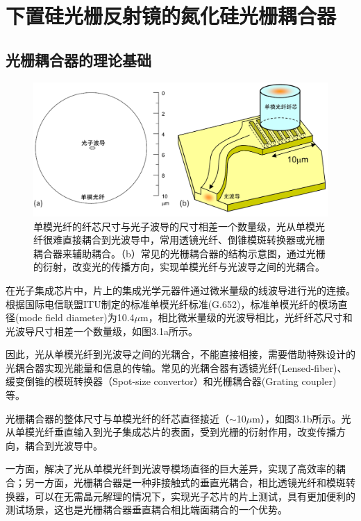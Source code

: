\chapter{下置硅光栅反射镜的氮化硅光栅耦合器}\label{chap:3}


\section{光栅耦合器的理论基础}


\begin{figure}[!htbp]
    \centering
    \includegraphics[width=1\textwidth]{Img/3-1.png}
    \caption{单模光纤的纤芯尺寸与光子波导的尺寸相差一个数量级，光从单模光纤很难直接耦合到光波导中，常用透镜光纤、倒锥模斑转换器或光栅耦合器来辅助耦合。（b）常见的光栅耦合器的结构示意图，通过光栅的衍射，改变光的传播方向，实现单模光纤与光波导之间的光耦合。\cite{Dirkgrating}}
    \label{fig:3-1}
\end{figure}

在光子集成芯片中，片上的集成光学元器件通过微米量级的线波导进行光的连接。根据国际电信联盟ITU制定的标准单模光纤标准(G.652)\cite{smf}，标准单模光纤的模场直径(mode field diameter)为10.4$\mu$m，相比微米量级的光波导相比，光纤纤芯尺寸和光波导尺寸相差一个数量级，如图3.1a所示。

因此，光从单模光纤到光波导之间的光耦合，不能直接相接，需要借助特殊设计的光耦合器实现光能量和信息的传输。常见的光耦合器有透镜光纤(Lensed-fiber)、缓变倒锥的模斑转换器（Spot-size convertor）\cite{Shoji2002Low,Sharee2003Ultra}和光栅耦合器(Grating coupler)等。

光栅耦合器的整体尺寸与单模光纤的纤芯直径接近（$\sim$10$\mu$m），如图3.1b所示。光从单模光纤垂直输入到光子集成芯片的表面，受到光栅的衍射作用，改变传播方向，耦合到光波导中。

一方面，解决了光从单模光纤到光波导模场直径的巨大差异，实现了高效率的耦合；另一方面，光栅耦合器是一种非接触式的垂直光耦合，相比透镜光纤和模斑转换器，可以在无需晶元解理的情况下，实现光子芯片的片上测试，具有更加便利的测试场景，这也是光栅耦合器垂直耦合相比端面耦合的一个优势。\cite{Dirkgrating}

